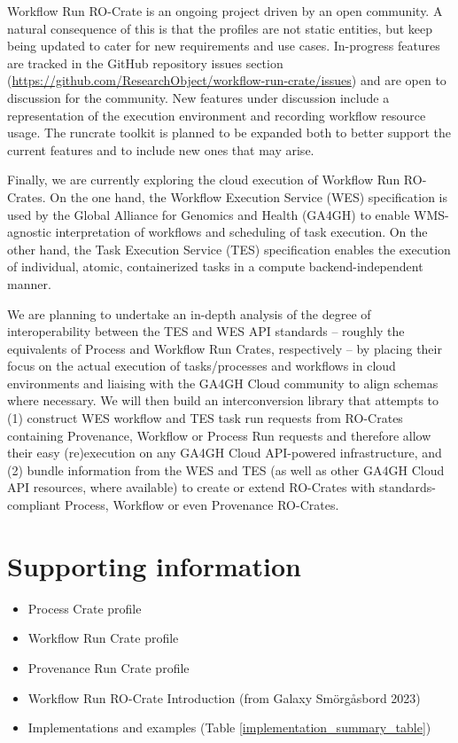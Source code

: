 \documentclass[10pt,letterpaper]{article}
\begin{document}
Workflow Run RO-Crate is an ongoing project driven by an open community.
A natural consequence of this is that the profiles are not static entities, but keep being updated to cater for new requirements and use cases.
In-progress features are tracked in the GitHub repository issues section (\url{https://github.com/ResearchObject/workflow-run-crate/issues}) and are open to discussion for the community.
New features under discussion include a representation of the execution environment and recording workflow resource usage.
The runcrate toolkit is planned to be expanded both to better support the current features and to include new ones that may arise.

Finally, we are currently exploring the cloud execution of Workflow Run RO-Crates.
On the one hand, the Workflow Execution Service (WES) specification is used by the Global Alliance for Genomics and Health (GA4GH) \cite{Rehm 2021} to enable WMS-agnostic interpretation of workflows and scheduling of task execution. On the other hand, the Task Execution Service (TES) specification enables the execution of individual, atomic, containerized tasks in a compute backend-independent manner.

We are planning to undertake an in-depth analysis of the degree of interoperability between the TES and WES API standards -- roughly the equivalents of Process and Workflow Run Crates, respectively – by placing their focus on the actual execution of tasks/processes and workflows in cloud environments and liaising with the GA4GH Cloud community to align schemas where necessary.
We will then build an interconversion library that attempts to (1) construct WES workflow and TES task run requests from RO-Crates containing Provenance, Workflow or Process Run requests and therefore allow their easy (re)execution on any GA4GH Cloud API-powered infrastructure, and (2) bundle information from the WES and TES (as well as other GA4GH Cloud API resources, where available) to create or extend RO-Crates with standards-compliant Process, Workflow or even Provenance RO-Crates.



\section*{Supporting information}

\begin{itemize}
    \item Process Crate profile \cite{WRROC 2023a}
    \item Workflow Run Crate profile \cite{WRROC 2023b}
    \item Provenance Run Crate profile \cite{WRROC 2023c}
    \item Workflow Run RO-Crate Introduction \cite{runcrate-intro} (from Galaxy Smörgåsbord 2023) 
    \item Implementations and examples (Table \ref{implementation_summary_table})
\end{itemize}
\end{document}
